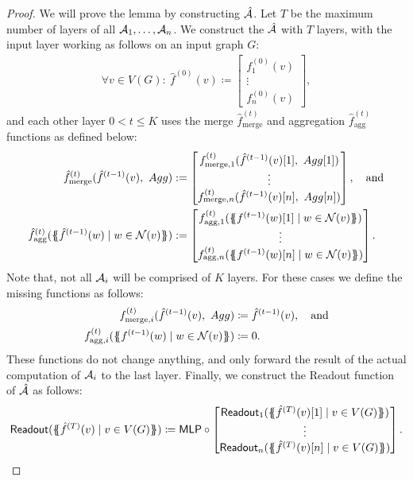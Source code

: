 \begin{proof}
    We will prove the lemma by constructing $\hat{\mathcal{A}}$. Let $T$ be the maximum number of layers of all $\mathcal{A}_1, \dots, \mathcal{A}_n$. We construct the \gnn $\hat{\mathcal{A}}$ with $T$ layers, with the input layer working as follows on an input graph $G$:
    \begin{align*}
        \forall v \in V(G): \ \hat{f}^{(0)}(v) \coloneqq \begin{bmatrix}
            f^{(0)}_1(v)\\
            \vdots\\
            f^{(0)}_n(v)
        \end{bmatrix},
    \end{align*}
    and each other layer $0 < t \leq K$ uses the merge $\hat{f}^{(t)}_{\text{merge}}$ and aggregation $\hat{f}^{(t)}_{\text{agg}}$ functions as defined below:
    \begin{align*}
        \hat{f}^{(t)}_{\text{merge}} (\hat{f}^{(t-1)}(v), \ Agg) &:= \begin{bmatrix}
            f^{(t)}_{\text{merge}, 1}(\hat{f}^{(t-1)}(v)[1],\ Agg[1])\\
            \vdots\\
            f^{(t)}_{\text{merge}, n}(\hat{f}^{(t-1)}(v)[n],\ Agg[n])
        \end{bmatrix},\quad \text{and}\\
        \hat{f}^{(t)}_{\text{agg}}(\MSopen \hat{f}^{(t-1)}(w) \mid w \in \mathcal{N}(v) \MSclose ) &:= \begin{bmatrix}
            f^{(t)}_{\text{agg}, 1}(\MSopen f^{(t-1)}(w)[1] \mid w \in \mathcal{N}(v) \MSclose)\\
            \vdots\\
            f^{(t)}_{\text{agg}, n}(\MSopen f^{(t-1)}(w)[n] \mid w \in \mathcal{N}(v) \MSclose)
        \end{bmatrix}.
    \end{align*}
    Note that, not all $\mathcal{A}_i$ will be comprised of $K$ layers. For these cases we define the missing functions as follows:
    \begin{align*}
        f^{(t)}_{\text{merge}, i}(\hat{f}^{(t-1)}(v), \ Agg) &\coloneqq \hat{f}^{(t-1)}(v), \quad \text{and}\\
        f^{(t)}_{\text{agg}, i}(\{\!\!\{ f^{(t-1)}(w) \mid w \in \mathcal{N}(v) \}\!\!\}) &\coloneqq 0.
    \end{align*}
    These functions do not change anything, and only forward the result of the actual computation of $\mathcal{A}_i$ to the last layer. Finally, we construct the \textsf{Readout} function of $\hat{\mathcal{A}}$ as follows:
    \begin{align*}
        \textsf{Readout}(\MSopen \hat{f}^{(T)}(v) \mid v \in V(G) \MSclose) \coloneqq \mlp \circ \begin{bmatrix}
            \textsf{Readout}_1(\MSopen \hat{f}^{(T)}(v)[1] \mid v \in V(G) \MSclose)\\
            \vdots\\
            \textsf{Readout}_n(\MSopen \hat{f}^{(T)}(v)[n] \mid v \in V(G) \MSclose)
        \end{bmatrix}.
    \end{align*}
\end{proof}

